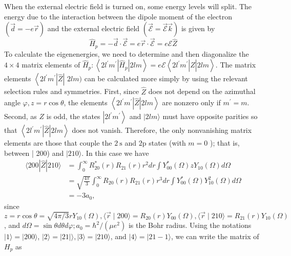 When the external electric field is turned on, some energy levels will split. The energy due to the interaction between the dipole moment of the electron $(\vec{d}=-e \vec{r})$ and the external electric field $(\overrightarrow{\mathcal{E}}=\overrightarrow{\mathcal{E}} \vec{k})$ is given by
$$
\hat{H}_{p}=-\vec{d} \cdot \overrightarrow{\mathcal{E}}=e \vec{r} \cdot \overrightarrow{\mathcal{E}}=e \mathcal{E} \hat{Z}
$$
To calculate the eigenenergies, we need to determine and then diagonalize the $4 \times 4$ matrix elements of $\hat{H}_{p}:\left\langle 2 l^{\prime} m^{\prime}\left|\hat{H}_{p}\right| 2 l m\right\rangle=e \mathcal{E}\left\langle 2 l^{\prime} m^{\prime}|\hat{Z}| 2 l m\right\rangle .$ The matrix elements $\left\langle 2 l^{\prime} m^{\prime}|\hat{Z}|\right.$ $2 l m)$ can be calculated more simply by using the relevant selection rules and symmetries. First, since $\hat{Z}$ does not depend on the azimuthal angle $\varphi, z=r \cos \theta$, the elements $\left\langle 2 l^{\prime} m^{\prime}|\hat{Z}| 2 l m\right\rangle$ are nonzero only if $m^{\prime}=m$. Second, as $Z$ is odd, the states $\left|2 l^{\prime} m^{\prime}\right\rangle$ and $|2 l m\rangle$ must have opposite parities so that $\left\langle 2 l^{\prime} m^{\prime}|\hat{Z}| 2 l m\right\rangle$ does not vanish. Therefore, the only nonvanishing matrix elements are those that couple the $2 \mathrm{~s}$ and $2 \mathrm{p}$ states (with $m=0$ ); that is, between | 200) and $|210\rangle$. In this case we have\\
$$\begin{aligned}
	\langle 200|\hat{Z}| 210\rangle &=\int_{0}^{\infty} R_{20}^{*}(r) R_{21}(r) r^{2} d r \int Y_{00}^{*}(\Omega) z Y_{10}(\Omega) d \Omega \\
	&=\sqrt{\frac{4 \pi}{3}} \int_{0}^{\infty} R_{20}(r) R_{21}(r) r^{3} d r \int Y_{00}^{*}(\Omega) Y_{10}^{2}(\Omega) d \Omega \\
	&=-3 a_{0},
\end{aligned}$$
since $z=r \cos \theta=\sqrt{4 \pi / 3} r Y_{10}(\Omega),\langle\vec{r} \mid 200\rangle=R_{20}(r) Y_{00}(\Omega),\langle\vec{r} \mid 210\rangle=R_{21}(r) Y_{10}(\Omega)$, and $d \Omega=\sin \theta d \theta d \varphi ; a_{0}=\hbar^{2} /\left(\mu e^{2}\right)$ is the Bohr radius. Using the notations $|1\rangle=|200\rangle$, $|2\rangle=|21|\rangle,|3\rangle=|210\rangle$, and $|4\rangle=|21-1\rangle$, we can write the matrix of $H_{p}$ as
